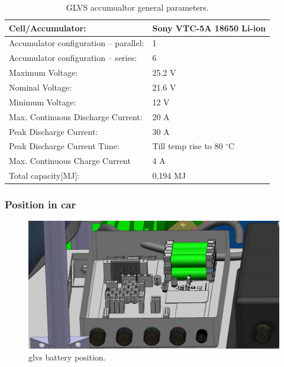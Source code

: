 \begin{table}[H]
	\centering
	\caption{GLVS accumualtor general parameters.}
	\begin{tabularx}{\textwidth}{|X|X|}\hline
		Cell/Accumulator: & Sony VTC-5A 18650 Li-ion\\[\TableSize]\hline
		Accumulator configuration – parallel: & 1 \\[\TableSize]\hline
		Accumulator configuration – series: & 6 \\[\TableSize]\hline
		Maximum Voltage: & 25.2 V \\[\TableSize]\hline
		Nominal Voltage: & 21.6 V \\[\TableSize]\hline
		Minimum Voltage: & 12 V \\[\TableSize]\hline
		Max. Continuous Discharge Current: & 20 A \\[\TableSize]\hline
		Peak Discharge Current: & 30 A \\[\TableSize]\hline
		Peak Discharge Current Time: & Till temp rise to 80 $^\circ$C \\[\TableSize]\hline
		Max. Continuous Charge Current & 4 A\\[\TableSize]\hline
		Total capacity[MJ]: & 0,194 MJ \\[\TableSize]\hline
	\end{tabularx}%
	\label{tab:LVbatt-general}%
\end{table}%

\subsubsection{Position in car}

\begin{figure}[H]
	\centering
	\includegraphics[width=\textwidth,clip]{./img/ECUB_BATTERY_POSITION.jpg}
	\caption{\gls{glvs} battery position.}
	\label{fig:GLVS_battery_position}
\end{figure}
